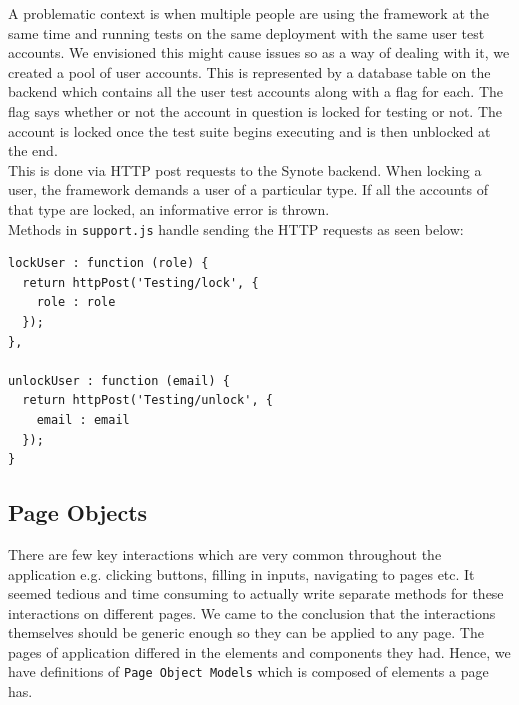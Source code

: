 A problematic context is when multiple people are using the framework at the same time and running tests on the same deployment with the same user test accounts. We envisioned this might cause issues so as a way of dealing with it, we created a pool of user accounts. This is represented by a database table on the backend which contains all the user test accounts along with a flag for each. The flag says whether or not the account in question is locked for testing or not. The account is locked once the test suite begins executing and is then unblocked at the end.
\\

This is done via HTTP post requests to the Synote backend. When locking a user, the framework demands a user of a particular type. If all the accounts of that type are locked, an informative error is thrown.
\\

Methods in \texttt{support.js} handle sending the HTTP requests as seen below:

\begin{listing}[H]
\begin{verbatim}
lockUser : function (role) {
  return httpPost('Testing/lock', {
    role : role
  });
},

unlockUser : function (email) {
  return httpPost('Testing/unlock', {
    email : email
  });
}
\end{verbatim}
\label{lst:login-and-logout-hooks}
\end{listing}

\subsection{Page Objects}
\label{subsec:page-objects}
There are few key interactions which are very common throughout the application e.g. clicking buttons, filling in inputs, navigating to pages etc. It seemed tedious and time consuming to actually write separate methods for these interactions on different pages. We came to the conclusion that the interactions themselves should be generic enough so they can be applied to any page. The pages of application differed in the elements and components they had. Hence, we have definitions of \texttt{Page Object Models} which is composed of elements a page has.

